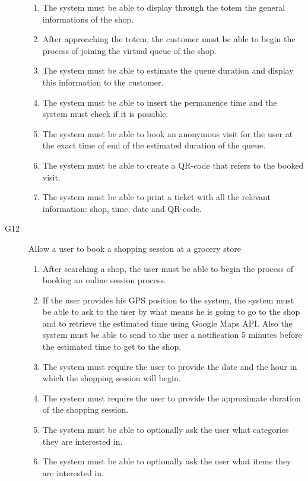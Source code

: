 \begin{description}
        \begin{enumerate}[resume*]
            \item The system must be able to display through the totem the general informations of the shop.
            \item After approaching the totem, the customer must be able to begin the process of joining the virtual queue of the shop.
            \item The system must be able to estimate the queue duration and display this information to the customer.
            \item The system must be able to insert the permanence time and the system must check if it is possible.
            \item The system must be able to book an anonymous visit for the user at the exact time of end of the estimated duration of the queue.
            \item The system must be able to create a QR-code that refers to the booked visit.
            \item The system must be able to print a ticket with all the relevant information: shop, time, date and QR-code.
        \end{enumerate}
    \item [G12] Allow a user to book a shopping session at a grocery store
        \begin{enumerate}[resume*]
            \item After searching a shop, the user must be able to begin the process of booking an online session process.
            \item If the user provides his GPS position to the system, the system must be able to ask to the user by what means he is going to go to the shop and to retrieve the estimated time using Google Maps API. Also the system must be able to send to the user a notification 5 minutes before the estimated time to get to the shop.
            \item The system must require the user to provide the date and the hour in which the shopping session will begin.
            \item The system must require the user to provide the approximate duration of the shopping session.
            \item The system must be able to optionally ask the user what categories they are interested in.
            \item The system must be able to optionally ask the user what items they are interested in.

\end{enumerate}
\end{description}
